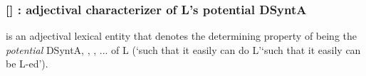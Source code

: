 \subsubsection*{{\small []}  : adjectival characterizer of L's potential DSyntA\thinspace{}}\label{lf:Able-i}

 is an adjectival lexical entity that denotes the determining property of being the \emph{potential} DSyntA\thinspace{}, , , ... of L (`such that it easily can do L'\slashs`such that it easily can be L-ed').

